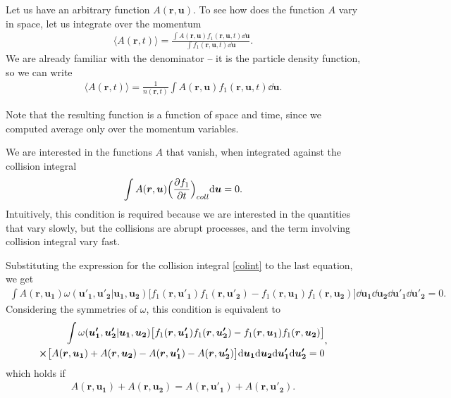Let us have an arbitrary function $A(\bm{r},\bm{u})$.
To see how does the function $A$ vary in space, let us integrate over the momentum
\begin{align} \label{averg}
\langle A(\bm{r},t) \rangle = \frac{\int A(\bm{r},\bm{u}) f_1(\bm{r},\bm{u},t) \dd \bm{u}}{\int f_1(\bm{r},\bm{u},t) \dd \bm{u}}.
\end{align}
We are already familiar with the denominator -- it is the particle density function, so we can write
\begin{align*}
\langle A(\bm{r},t) \rangle = \frac{1}{n(\bm{r},t)} \int A(\bm{r},\bm{u}) f_1(\bm{r},\bm{u},t) \dd \bm{u}.
\end{align*} 

Note that the resulting function is a function of space and time, since we computed average only over the momentum variables.

We are interested in the functions $A$ that vanish, when integrated against the collision integral
\begin{align*}
\int A(\bm{r},\bm{u})  \Big( \frac{\partial f_1}{\partial t} \Big)_{coll} \mathrm{d} \bm{u} = 0.
\end{align*}
Intuitively, this condition is required because we are interested in the quantities that vary slowly, but the collisions are abrupt processes, and the term involving collision integral vary fast.

Substituting the expression for the collision integral \ref{colint} to the last equation, we get
\begin{align*}
\int A(\bm{r},\bm{u_1}) \omega(\bm{u'_1},\bm{u'_2} | \bm{u_1}, \bm{u_2}) \big[f_1(\bm{r},\bm{u'_1})f_1(\bm{r},\bm{u'_2}) - f_1(\bm{r},\bm{u_1})f_1(\bm{r},\bm{u_2}) \big] \dd \bm{u_1} \dd \bm{u_2} \dd \bm{u'_1} \dd \bm{u'_2} = 0.
\end{align*}
Considering the symmetries of $\omega$, this condition is equivalent to
\begin{align*}
\begin{split}
\int \omega(\bm{u'_1},\bm{u'_2} | \bm{u_1}, \bm{u_2}) \big[f_1(\bm{r},\bm{u'_1})f_1(\bm{r},\bm{u'_2}) - f_1(\bm{r},\bm{u_1})f_1(\bm{r},\bm{u_2}) \big] \\ \cross \big[A(\bm{r},\bm{u_1}) + A(\bm{r},\bm{u_2}) - A(\bm{r},\bm{u'_1}) - A(\bm{r},\bm{u'_2}) \big] \mathrm{d} \bm{u_1} \mathrm{d} \bm{u_2} \mathrm{d} \bm{u'_1} \mathrm{d} \bm{u'_2} = 0
\end{split},
\end{align*}
which holds if
\begin{align*}
A(\bm{r},\bm{u_1}) + A(\bm{r},\bm{u_2}) = A(\bm{r},\bm{u'_1}) + A(\bm{r},\bm{u'_2}).
\end{align*}


